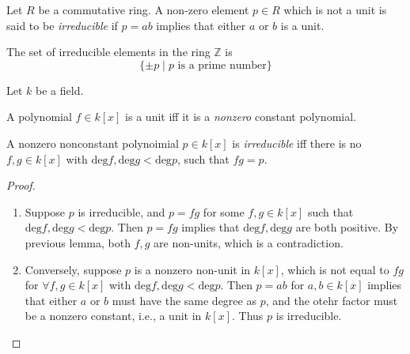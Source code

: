 \begin{definition}[Irreducible]
Let $R$ be a commutative ring. A non-zero element $p\in R$ which is not a unit is said to be \emph{irreducible} if $p=ab$ implies that either $a$ or $b$ is a unit.
\end{definition}
\begin{example}
The set of irreducible elements in the ring $\mathbb{Z}$ is
\[
\{\pm p\mid p\mbox{ is a prime number}\}
\]
\end{example}
Let $k$ be a field.
\begin{proposition}
A polynomial $f\in k[x]$ is a unit iff it is a \emph{nonzero} constant polynomial.
\end{proposition}
\begin{proposition}
A nonzero nonconstant polynoimial $p\in k[x]$ is \emph{irreducible} iff there is no $f,g\in k[x]$ with $\mbox{deg}f,\mbox{deg}g<\mbox{deg}p$, such that $fg=p$.
\end{proposition}
\begin{proof}
\begin{enumerate}
\item
Suppose $p$ is irreducible, and $p=fg$ for some $f,g\in k[x]$ such that $\mbox{deg}f,\mbox{deg}g<\mbox{deg}p$. Then $p=fg$ implies that $\mbox{deg}f,\mbox{deg}g$ are both positive. By previous lemma, both $f,g$ are non-units, which is a contradiction.
\item
Conversely, suppose $p$ is a nonzero non-unit in $k[x]$, which is not equal to $fg$ for $\forall f,g\in k[x]$ with $\mbox{deg}f,\mbox{deg}g<\mbox{deg}p$. Then $p=ab$ for $a,b\in k[x]$ implies that either $a$ or $b$ must have the same degree as $p$, and the otehr factor must be a nonzero constant, i.e., a unit in $k[x]$. Thus $p$ is irreducible.
\end{enumerate}
\end{proof}

